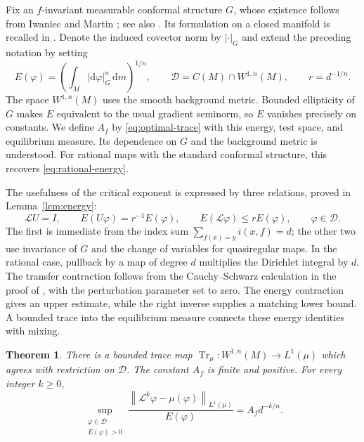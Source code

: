 \documentclass[11pt,reqno]{amsart}
\theoremstyle{plain}
\newtheorem{theorem}{Theorem}[section]
\theoremstyle{definition}
\theoremstyle{remark}
\newcommand{\E}{\mathbb E}
\newcommand{\Lop}{\mathcal L}
\newcommand{\Dcal}{\mathcal D}
\newcommand{\Tr}{\operatorname{Tr}_{\mu}}
\newcommand{\norm}[1]{\left\lVert #1\right\rVert}
\newcommand{\dd}{\mathrm d}
\numberwithin{equation}{section}
\begin{document}
Fix an $f$-invariant measurable conformal structure $G$, whose existence follows from Iwaniec and Martin \cite[Theorem 5.1]{IM96}; see also \cite[Section 21.5]{IM01}. Its formulation on a closed manifold is recalled in \cite[Section 4]{OP14}. Denote the induced covector norm by $|\cdot|_G$ and extend the preceding notation by setting
\begin{equation}\label{eq:energy-intro}
 E(\varphi)=\left(\int_M|\dd\varphi|_G^n\,\dd m\right)^{1/n},
 \qquad \Dcal=C(M)\cap W^{1,n}(M),
 \qquad r=d^{-1/n}.
\end{equation}
The space $W^{1,n}(M)$ uses the smooth background metric. Bounded ellipticity of $G$ makes $E$ equivalent to the usual gradient seminorm, so $E$ vanishes precisely on constants. We define $A_f$ by \eqref{eq:optimal-trace} with this energy, test space, and equilibrium measure. Its dependence on $G$ and the background metric is understood. For rational maps with the standard conformal structure, this recovers \eqref{eq:rational-energy}.

The usefulness of the critical exponent is expressed by three relations, proved in Lemma~\ref{lem:energy}:
\begin{equation}\label{eq:intro-operator-mechanism}
 \Lop U=I,\qquad E(U\varphi)=r^{-1}E(\varphi),\qquad
 E(\Lop\varphi)\le rE(\varphi),\qquad\varphi\in\Dcal.
\end{equation}
The first is immediate from the index sum $\sum_{f(x)=y}i(x,f)=d$; the other two use invariance of $G$ and the change of variables for quasiregular maps. In the rational case, pullback by a map of degree $d$ multiplies the Dirichlet integral by $d$. The transfer contraction follows from the Cauchy--Schwarz calculation in the proof of \cite[Proposition 4.2]{DNS07}, with the perturbation parameter set to zero.
The energy contraction gives an upper estimate, while the right inverse supplies a matching lower bound. A bounded trace into the equilibrium measure connects these energy identities with mixing.

\begin{theorem}\label{thm:main}
There is a bounded trace map $\Tr\colon W^{1,n}(M)\to L^1(\mu)$ which agrees with restriction on $\Dcal$. The constant $A_f$ is finite and positive. For every integer $k\ge0$,
\begin{equation}\label{eq:sharp-mixing}
 \sup_{\substack{\varphi\in\Dcal\\E(\varphi)>0}}
 \frac{\norm{\Lop^k\varphi-\mu(\varphi)}_{L^1(\mu)}}{E(\varphi)}
 =A_f d^{-k/n}.
\end{equation}
\end{theorem}
\end{document}
